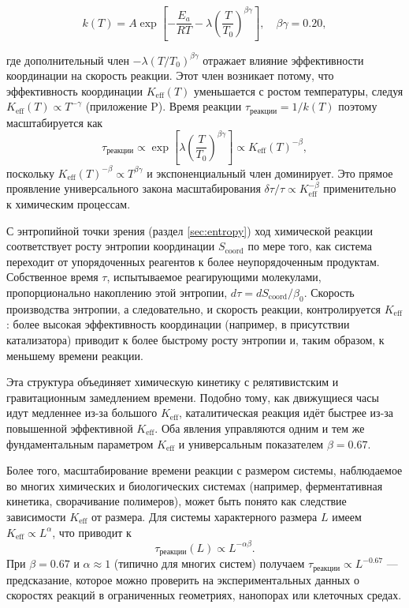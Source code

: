 \documentclass[12pt,a4paper]{article}
\newcommand{\Keff}{K_{\mathrm{eff}}}
\newcommand{\Scoord}{S_{\mathrm{coord}}}
\begin{document}
	\begin{equation}
		k(T) = A \exp\left[-\frac{E_a}{RT} - \lambda \left(\frac{T}{T_0}\right)^{\beta\gamma}\right], \quad \beta\gamma = 0.20,
	\end{equation}
	
	где дополнительный член \(-\lambda (T/T_0)^{\beta\gamma}\) отражает влияние эффективности координации на скорость реакции. Этот член возникает потому, что эффективность координации \(\Keff(T)\) уменьшается с ростом температуры, следуя \(\Keff(T) \propto T^{-\gamma}\) (приложение P). Время реакции \(\tau_{\mathrm{реакции}} = 1/k(T)\) поэтому масштабируется как
	\begin{equation}
		\tau_{\mathrm{реакции}} \propto \exp\left[\lambda \left(\frac{T}{T_0}\right)^{\beta\gamma}\right] \propto \Keff(T)^{-\beta},
	\end{equation}
	поскольку \(\Keff(T)^{-\beta} \propto T^{\beta\gamma}\) и экспоненциальный член доминирует. Это прямое проявление универсального закона масштабирования \(\delta \tau / \tau \propto \Keff^{-\beta}\) применительно к химическим процессам.
	
	С энтропийной точки зрения (раздел \ref{sec:entropy}) ход химической реакции соответствует росту энтропии координации \(\Scoord\) по мере того, как система переходит от упорядоченных реагентов к более неупорядоченным продуктам. Собственное время \(\tau\), испытываемое реагирующими молекулами, пропорционально накоплению этой энтропии, \(d\tau = d\Scoord / \beta_0\). Скорость производства энтропии, а следовательно, и скорость реакции, контролируется \(\Keff\): более высокая эффективность координации (например, в присутствии катализатора) приводит к более быстрому росту энтропии и, таким образом, к меньшему времени реакции.
	
	Эта структура объединяет химическую кинетику с релятивистским и гравитационным замедлением времени. Подобно тому, как движущиеся часы идут медленнее из-за большого \(\Keff\), каталитическая реакция идёт быстрее из-за повышенной эффективной \(\Keff\). Оба явления управляются одним и тем же фундаментальным параметром \(\Keff\) и универсальным показателем \(\beta = 0.67\).
	
	Более того, масштабирование времени реакции с размером системы, наблюдаемое во многих химических и биологических системах (например, ферментативная кинетика, сворачивание полимеров), может быть понято как следствие зависимости \(\Keff\) от размера. Для системы характерного размера \(L\) имеем \(\Keff \propto L^{\alpha}\), что приводит к
	\begin{equation}
		\tau_{\mathrm{реакции}}(L) \propto L^{-\alpha\beta}.
	\end{equation}
	При \(\beta = 0.67\) и \(\alpha \approx 1\) (типично для многих систем) получаем \(\tau_{\mathrm{реакции}} \propto L^{-0.67}\) — предсказание, которое можно проверить на экспериментальных данных о скоростях реакций в ограниченных геометриях, нанопорах или клеточных средах.
	
\end{document}
